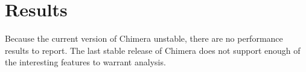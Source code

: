 \section{Results}
\label{results}

Because the current version of Chimera unstable, there are no performance
results to report. The last stable release of Chimera does not support enough
of the interesting features to warrant analysis.
